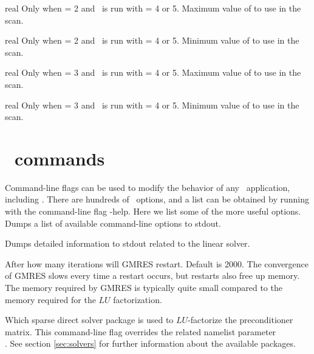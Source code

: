 \myhrule

{real}
{Only when  = 2 and \sfincsScan~is run with  = 4 or 5.}
{Maximum value of  to use in the scan.}

\myhrule

{real}
{Only when  = 2 and \sfincsScan~is run with  = 4 or 5.}
{Minimum value of  to use in the scan.}

\myhrule

{real}
{Only when  = 3 and \sfincsScan~is run with  = 4 or 5.}
{Maximum value of  to use in the scan.}

\myhrule

{real}
{Only when  = 3 and \sfincsScan~is run with  = 4 or 5.}
{Minimum value of  to use in the scan.}


\section{\PETSc~commands}

Command-line flags can be used to modify the behavior of any \PETSc~application, including \sfincs.
There are hundreds of \PETSc~options, and a list can be obtained by running with the command-line flag
{\ttfamily -help}. Here we list some of the more useful options.\\

{Dumps a list of available command-line options to stdout.}

\myhrule

{Dumps detailed information to stdout related to the linear solver.}

\myhrule

{After how many iterations will GMRES restart. Default is 2000. The convergence of GMRES slows every time a restart occurs, but restarts also free up memory.
The memory required by GMRES is typically quite small compared to the memory required for the $LU$ factorization.}

\myhrule

{Which sparse direct solver package is used to $LU$-factorize the preconditioner matrix.
This command-line flag overrides the related namelist parameter\\
.
See section \ref{sec:solvers} for further information about the available packages.
}

